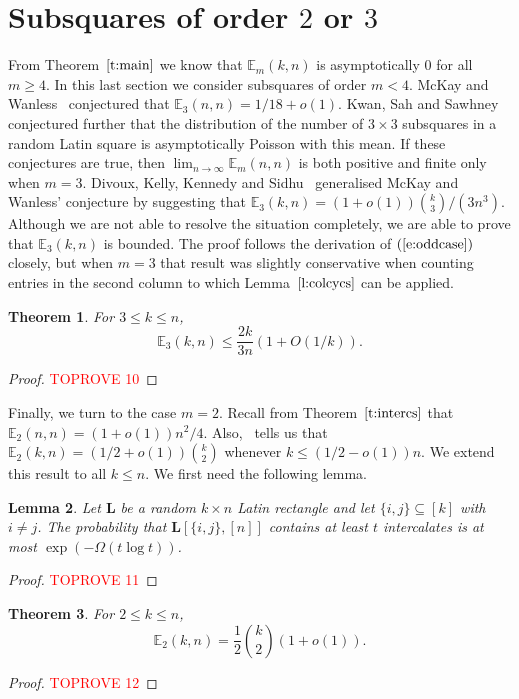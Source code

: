 \documentclass[12pt]{article}
\newtheorem{thm}{Theorem}[section]
\newtheorem{lem}[thm]{Lemma}
\theoremstyle{definition}
\numberwithin{equation}{section}
\def\eref#1{$(\ref{#1})$}
\def\lref#1{Lemma~$\ref{#1}$}
\def\tref#1{Theorem~$\ref{#1}$}
\renewcommand{\leq}{\leqslant}
\renewcommand{\ge}{\geqslant}
\renewcommand{\le}{\leqslant}
\renewcommand{\L}{\mathbf{L}}
\newcommand{\E}{\mathbb{E}}
\begin{document}
	\section{Subsquares of order $2$ or $3$}\label{s:subsq3}
	
	From \tref{t:main} we know that $\E_m(k,n)$ is asymptotically $0$ for
	all $m\ge4$. In this last section we consider subsquares of order $m<4$.
	McKay and Wanless~\cite{manysubsq} conjectured that
	$\E_3(n,n)=1/18+o(1)$. Kwan, Sah and Sawhney \cite{KSS} conjectured
	further that the distribution of the number of $3\times3$ subsquares
	in a random Latin square is asymptotically Poisson with this mean. If
	these conjectures are true, then $\lim_{n \to \infty} \E_m(n, n)$ is
	both positive and finite only when $m=3$.  Divoux, Kelly, Kennedy and
	Sidhu~\cite{subsqrandom} generalised McKay and Wanless' conjecture by
	suggesting that $\E_3(k, n) = (1+o(1))\binom{k}{3}/(3n^3)$.  Although
	we are not able to resolve the situation completely, we are able to
	prove that $\E_3(k, n)$ is bounded. The proof follows the derivation
	of \eref{e:oddcase} closely, but when $m=3$ that result was slightly
	conservative when counting entries in the second column to which
	\lref{l:colcycs} can be applied.
	
	\begin{thm} For $3\le k\le n$,
		\[
		\E_3(k, n) \leq \frac{2k}{3n}(1+O(1/k)).
		\]
	\end{thm}
	
	\begin{proof}\textcolor{red}{TOPROVE 10}\end{proof}
	
	Finally, we turn to the case $m=2$. Recall from \tref{t:intercs} that
	$\mathbb{E}_2(n,n) =
	(1+o(1))n^2/4$. Also,~\cite[Corollary~$1.7$]{subsqrandom} tells us
	that $\mathbb{E}_2(k,n)=(1/2+o(1))\binom{k}{2}$ whenever
	$k\leq(1/2-o(1))n$. We extend this result to all $k \leq n$. We first
	need the following lemma.
	
	\begin{lem}\label{l:intercbound}
		Let $\mathbf{L}$ be a random $k \times n$ Latin rectangle and let
		$\{i, j\} \subseteq [k]$ with $i \neq j$. The probability that
		$\L[\{i, j\}, [n]]$ contains at least $t$ intercalates is at most
		$\exp(-\Omega(t\log t))$.
	\end{lem}
	
	\begin{proof}\textcolor{red}{TOPROVE 11}\end{proof}
	
	
	
\begin{thm}
  For $2 \leq k \leq n$, 
  \[
  \mathbb{E}_2(k,n)=\frac12\binom{k}{2}(1+o(1)).
  \]
\end{thm}

\begin{proof}\textcolor{red}{TOPROVE 12}\end{proof}
	
\printbibliography
	
\end{document}
